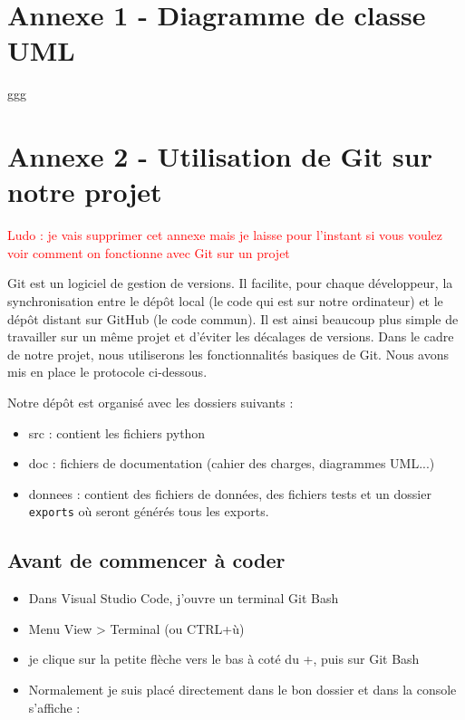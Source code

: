 \documentclass[11pt]{article}
\begin{document}


\newpage
{}
\appendix  %
\section*{Annexe 1 - Diagramme de classe UML}


ggg



\newpage

\section*{Annexe 2 - Utilisation de Git sur notre projet}

\textcolor{red}{Ludo : je vais supprimer cet annexe mais je laisse pour l'instant si vous voulez voir comment on fonctionne avec Git sur un projet}


Git est un logiciel de gestion de versions. Il facilite, pour chaque développeur, la synchronisation entre le dépôt local (le code qui est sur notre ordinateur) et le dépôt distant sur GitHub (le code commun). Il est ainsi beaucoup plus simple de travailler sur un même projet et d'éviter les décalages de versions. Dans le cadre de notre projet, nous utiliserons les fonctionnalités basiques de Git. Nous avons mis en place le protocole ci-dessous.

\bigbreak

Notre dépôt est organisé avec les dossiers suivants :
\begin{itemize}
    \item src : contient les fichiers python
    \item doc : fichiers de documentation (cahier des charges, diagrammes UML...)
    \item donnees : contient des fichiers de données, des fichiers tests et un dossier \texttt{exports} où seront générés tous les exports. 
\end{itemize}


\subsection*{Avant de commencer à coder}

\begin{itemize}
    \item Dans Visual Studio Code, j'ouvre un terminal Git Bash
    \item Menu View > Terminal (ou CTRL+ù)
    \item je clique sur la petite flèche vers le bas à coté du +, puis sur Git Bash
    \item Normalement je suis placé directement dans le bon dossier et dans la console s'affiche : 
\end{itemize}
\end{document}
